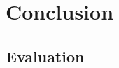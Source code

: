\documentclass[]{final_report}
\begin{document}

\chapter{Conclusion}


\section{Evaluation}


\renewcommand*{\bibfont}{\normalfont\small}
\printbibliography{}
\end{document}
